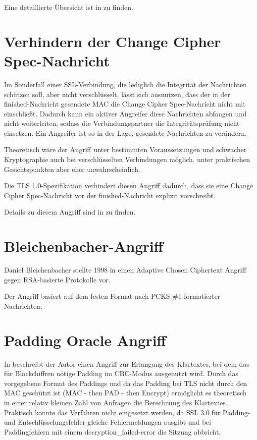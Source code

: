 \documentclass[
    12pt,
    headings=small,
    parskip=half,           %
    bibliography=totoc,
    numbers=noenddot,       %
    open=any,               %
   final                   %
    ]{scrreprt}
\newcommand{\finished}				{finished}
\newcommand{\changecipherspec}	{Change Cipher Spec}
\begin{document}
Eine detaillierte Übersicht ist in \cite{wagner96} zu finden.

\section{Verhindern der \changecipherspec{}-Nachricht}

Im Sonderfall einer SSL-Verbindung, die lediglich die Integrität der Nachrichten schützen soll, aber nicht verschlüsselt, lässt sich ausnutzen, dass der in der \finished{}-Nachricht gesendete MAC die \changecipherspec{}-Nachricht nicht mit einschließt. Dadurch kann ein aktiver Angreifer diese Nachrichten abfangen und nicht weiterleiten, sodass die Verbindungspartner die Integritätsprüfung nicht einsetzen. Ein Angreifer ist so in der Lage, gesendete Nachrichten zu verändern. 

Theoretisch wäre der Angriff unter bestimmten Voraussetzungen und schwacher Kryptographie auch bei verschlüsselten Verbindungen möglich, unter praktischen Gesichtspunkten aber eher unwahrscheinlich.

Die TLS 1.0-Spezifikation verhindert diesen Angriff dadurch, dass sie eine \changecipherspec{}-Nachricht vor der \finished{}-Nachricht explizit vorschreibt.

Details zu diesem Angriff sind in \cite{wagner96} zu finden.


\section{Bleichenbacher-Angriff}

Daniel Bleichenbacher stellte 1998 in \cite{bleichenbacher98} einen Adaptive Chosen Ciphertext Angriff gegen RSA-basierte Protokolle vor.

Der Angriff basiert auf dem festen Format nach PCKS \#1 formatierter Nachrichten. 

\section{Padding Oracle Angriff}

In \cite{vaudenay02} beschreibt der Autor einen Angriff zur Erlangung des Klartextes, bei dem das für Blockchiffren nötige Padding im CBC-Modus ausgenutzt wird. Durch das vorgegebene Format des Paddings und da das Padding bei TLS nicht durch den MAC geschützt ist (MAC - then PAD - then Encrypt) ermöglicht es theoretisch in einer relativ kleinen Zahl von Anfragen die Berechnung des Klartextes. Praktisch konnte das Verfahren nicht eingesetzt werden, da SSL 3.0 für Padding- und Entschlüsselungsfehler gleiche Fehlermeldungen ausgibt  und bei Paddingfehlern mit einem decryption\_failed-error die Sitzung abbricht.
\end{document}
